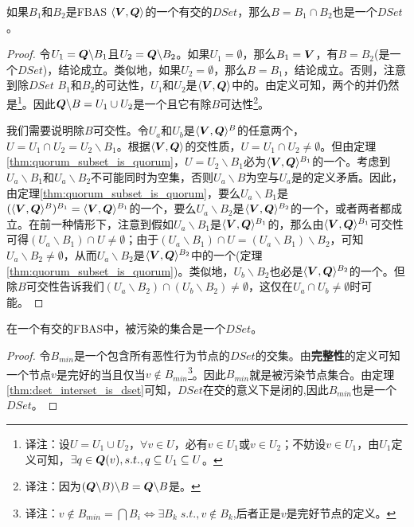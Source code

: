 \begin{theorem}\label{thm:dset_interset_is_dset}
        如果$B_1$和$B_2$是FBAS $\langle{\bm V},{\bm Q}\rangle$的一个有{\quorum}交的$DSet$，那么$B=B_1\cap B_2$也是一个$DSet$。
\end{theorem}

\begin{proof}
        令$U_1={\bm Q}\backslash B_1$且$U_2={\bm Q}\backslash B_2$。如果$U_1=\emptyset$，那么$B_1={\bm V}$，有$B=B_2$(是一个$DSet$)，结论成立。类似地，如果$U_2=\emptyset$，那么$B=B_1$，结论成立。否则，注意到除$DSet$ $B_1$和$B_2$的{\quorum}可达性，$U_1$和$U_2$是$\langle{\bm V},{\bm Q}\rangle$中的{\quorum}。由定义可知，两个{\quorum}的并仍然是{\quorum}{\footnote{译注：设$U=U_1\cup U_2$，$\forall v\in U$，必有$v\in U_1$或$v\in U_2$；不妨设$v\in U_1$，由$U_1$定义可知，$\exists q\in {\bm Q}(v), s.t., q\subseteq U_1\subseteq U$。}}。因此${{\bm Q}\backslash B}=U_1\cup U_2$是一个{\quorum}且它有除$B${\quorum}可达性{\footnote{译注：因为$({\bm Q}\backslash B)\backslash B={\bm Q}\backslash B$是{\quorum}。}}。
        
        我们需要说明除$B${\quorum}可交性。令$U_a$和$U_b$是$\langle{\bm V},{\bm Q}\rangle^{B}$的任意两个{\quorum}，$U=U_1\cap U_2 = U_2\backslash B_1$。根据$\langle{\bm V},{\bm Q}\rangle$的{\quorum}交性质，$U=U_1\cap U_2  \neq \emptyset$。但由定理\ref{thm:quorum_subset_is_quorum}，$U=U_2\backslash B_1$必为$\langle{\bm V},{\bm Q}\rangle^{B_1}$的一个{\quorum}。考虑到$U_a\backslash B_1$和$U_a\backslash B_2$不可能同时为空集，否则$U_a\backslash B$为空与$U_a$是{\quorum}的定义矛盾。因此，由定理\ref{thm:quorum_subset_is_quorum}，要么$U_a\backslash B_1$是$(\langle{\bm V},{\bm Q}\rangle^{B})^{B_1}=\langle{\bm V},{\bm Q}\rangle^{B_1}$的一个{\quorum}，要么$U_a\backslash B_2$是$\langle{\bm V},{\bm Q}\rangle^{B_2}$的一个{\quorum}，或者两者都成立。在前一种情形下，注意到假如$U_a\backslash B_1$是$\langle{\bm V},{\bm Q}\rangle^{B_1}$的{\quorum}，那么由$\langle{\bm V},{\bm Q}\rangle^{B_1}${\quorum}可交性可得$(U_a\backslash B_1)\cap U\neq \emptyset$；由于$(U_a\backslash B_1)\cap U = (U_a\backslash B_1)\backslash B_2$，可知$U_a\backslash B_2\neq \emptyset$，从而$U_a\backslash B_2$是$\langle{\bm V},{\bm Q}\rangle^{B_2}$中的一个{\quorum}(定理\ref{thm:quorum_subset_is_quorum})。类似地，$U_b\backslash B_2$也必是$\langle{\bm V},{\bm Q}\rangle^{B_2}$的一个{\quorum}。但除$B${\quorum}可交性告诉我们$(U_a\backslash B_2)\cap (U_b\backslash B_2)\neq \emptyset$，这仅在$U_a\cap U_b\neq \emptyset$时可能。
\end{proof}

\begin{theorem}\label{thm:befouleds_are_dset}
        在一个有{\quorum}交的FBAS中，被污染的集合是一个$DSet$。
\end{theorem}

\begin{proof}
        令$B_{min}$是一个包含所有恶性行为节点的$DSet$的交集。由\textbf{完整性}的定义可知一个节点$v$是完好的当且仅当$v\not\in B_{min}${\footnote{译注：$v\not\in B_{min}=\bigcap B_{i}\iff \exists B_{k}\;s.t., v\not\in B_{k}$,后者正是$v$是完好节点的定义。}}。因此$B_{min}$就是被污染节点集合。由定理\ref{thm:dset_interset_is_dset}可知，$DSet$在交的意义下是闭的,因此$B_{min}$也是一个$DSet$。
\end{proof}

